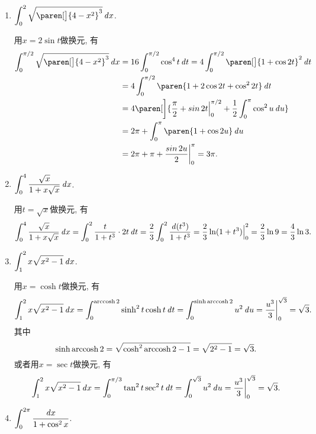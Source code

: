 \begin{enumerate}
\item \(\displaystyle \int_0^2 \sqrt{\paren[\big]{4-x^2}^3} \dx\).

  \ifshowsol
    用\(x = 2 \sin t\)做换元, 有
    \[
      \begin{split}
        \int_0^{\pi/2} \sqrt{\paren[\big]{4-x^2}^3} \dx
        &= 16 \int_0^{\pi/2} \cos^4 t \dt
          = 4 \int_0^{\pi/2} \paren[\big]{1 + \cos 2t}^2 \dt \\
        &= 4 \int_0^{\pi/2} \paren{1 + 2 \cos 2t + \cos^2 2t} \dt \\
        &= 4 \paren[\bigg]{\frac{\pi}{2} + \sin 2t \Big\vert_0^{\pi/2} + \frac12 \int_0^\pi \cos^2 u \du} \\
        &= 2 \pi + \int_0^\pi \paren{1 + \cos 2u} \du \\
        &= 2 \pi + \pi + \frac{\sin 2u}{2} \bigg\vert_0^\pi
          = 3 \pi.
      \end{split}
    \]
  \fi
\item \(\displaystyle \int_0^4 \frac{\sqrt x}{1 + x \sqrt{x}} \mathop{}\!\mathit{d} x\).

  \ifshowsol
    用\(t = \sqrt x\)做换元, 有
    \[
      \begin{split}
        \int_0^4 \frac{\sqrt x}{1 + x \sqrt{x}} \mathop{}\!\mathit{d} x
        = \int_0^2 \frac{t}{1+t^3} \cdot 2t \mathop{}\!\mathit{d} t
        = \frac23 \int_0^2 \frac{\mathop{}\!\mathit{d}(t^3)}{1+t^3}
        = \frac23 \ln(1+t^3) \Big\vert_0^2
        = \frac23 \ln9
        = \frac43 \ln3.
      \end{split}
    \]
  \fi

\item \(\displaystyle \int_1^2 x \sqrt{x^2 - 1} \mathop{}\!\mathit{d} x\).

  \ifshowsol
    用\(x = \cosh t\)做换元, 有
    \[
      \int_1^2 x \sqrt{x^2 - 1} \mathop{}\!\mathit{d} x
      = \int_0^{\operatorname{arccosh}2} \sinh^2 t \cosh t \mathop{}\!\mathit{d} t
      = \int_0^{\sinh\operatorname{arccosh}2} u^2 \mathop{}\!\mathit{d} u
      = \frac{u^3}{3} \bigg\vert_0^{\sqrt3}
      = \sqrt3.
    \]
    其中
    \[
      \sinh\operatorname{arccosh}2 = \sqrt{\cosh^2 \operatorname{arccosh} 2 - 1} = \sqrt{2^2 - 1} = \sqrt3.
    \]
    或者用\(x = \sec t\)做换元, 有
    \[
      \int_1^2 x \sqrt{x^2 - 1} \mathop{}\!\mathit{d} x
      = \int_0^{\pi/3} \tan^2 t \sec^2 t \mathop{}\!\mathit{d} t
      = \int_0^{\sqrt3} u^2 \mathop{}\!\mathit{d} u
      = \frac{u^3}{3} \bigg\vert_0^{\sqrt3}
      = \sqrt3.
    \]
  \fi

\item \(\displaystyle \int_0^{2\pi} \frac{\mathop{}\!\mathit{d} x}{1 + \cos^2 x}\).


\end{enumerate}
